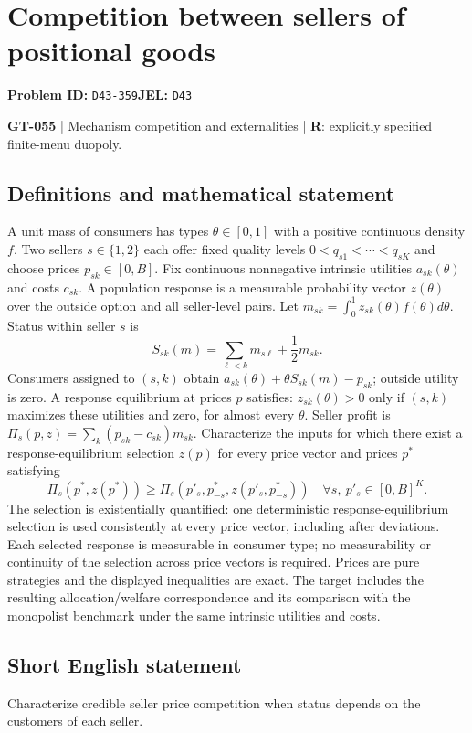 \documentclass[11pt,a4paper]{article}
\begin{document}
\section*{Competition between sellers of positional goods}
\textbf{Problem ID:} \texttt{D43-359}\quad \textbf{JEL:} \texttt{D43}\par
\label{problem:OP-0185}
\label{game:GT-055}
{\sffamily\small\color{muted}
\textbf{GT-055} | Mechanism competition and externalities | \textbf{R}: explicitly specified finite-menu duopoly.
\par}
\subsection*{Definitions and mathematical statement}
A unit mass of consumers has types $\theta\in[0,1]$ with a positive continuous density $f$. Two sellers $s\in\{1,2\}$ each offer fixed quality levels $0<q_{s1}<\cdots<q_{sK}$ and choose prices $p_{sk}\in[0,B]$. Fix continuous nonnegative intrinsic utilities $a_{sk}(\theta)$ and costs $c_{sk}$. A population response is a measurable probability vector $z(\theta)$ over the outside option and all seller-level pairs. Let $m_{sk}=\int_0^1z_{sk}(\theta)f(\theta)d\theta$. Status within seller $s$ is
\[
 S_{sk}(m)=\sum_{\ell<k}m_{s\ell}+\frac12m_{sk}.
\]
Consumers assigned to $(s,k)$ obtain $a_{sk}(\theta)+\theta S_{sk}(m)-p_{sk}$; outside utility is zero. A response equilibrium at prices $p$ satisfies: $z_{sk}(\theta)>0$ only if $(s,k)$ maximizes these utilities and zero, for almost every $\theta$. Seller profit is $\Pi_s(p,z)=\sum_k(p_{sk}-c_{sk})m_{sk}$.
Characterize the inputs for which there exist a response-equilibrium selection $z(p)$ for every price vector and prices $p^*$ satisfying
\[
 \Pi_s(p^*,z(p^*))\geq
 \Pi_s(p'_s,p^*_{-s},z(p'_s,p^*_{-s}))
 \quad\forall s,\ p'_s\in[0,B]^K.
\]
The selection is existentially quantified: one deterministic response-equilibrium selection is used consistently at every price vector, including after deviations. Each selected response is measurable in consumer type; no measurability or continuity of the selection across price vectors is required. Prices are pure strategies and the displayed inequalities are exact.
The target includes the resulting allocation/welfare correspondence and its comparison with the monopolist benchmark under the same intrinsic utilities and costs.
\subsection*{Short English statement}
Characterize credible seller price competition when status depends on the customers of each seller.
\end{document}
